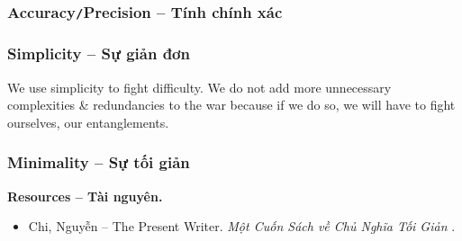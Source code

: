 \documentclass[12pt]{article}
\begin{document}
\subsubsection{Accuracy{\tt/}Precision -- Tính chính xác}

\subsubsection{Simplicity -- Sự giản đơn}
We use simplicity to fight difficulty. We do not add more unnecessary complexities \& redundancies to the war because if we do so, we will have to fight ourselves, our entanglements.

\subsubsection{Minimality -- Sự tối giản}
\noindent\textbf{\textsf{Resources -- Tài nguyên.}}
\begin{itemize}
	\item {\sc Chi, Nguyễn -- The Present Writer}. {\it Một Cuốn Sách về Chủ Nghĩa Tối Giản} \cite{Chi2022}.
\end{itemize}
\end{document}
